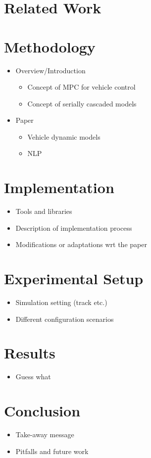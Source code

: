 \documentclass[a4paper, twocolumn, 11pt, twoside]{article}
\begin{document}
\section*{Related Work}


\section*{Methodology}

\begin{itemize}
    \item Overview/Introduction
    \begin{itemize}
        \item Concept of MPC for vehicle control
        \item Concept of serially cascaded models 
    \end{itemize}

    \item Paper
    \begin{itemize}
        \item Vehicle dynamic models
        \item NLP
    \end{itemize}    
\end{itemize}

\section*{Implementation}

\begin{itemize}
    \item Tools and libraries
    \item Description of implementation process
    \item Modifications or adaptations wrt the paper
\end{itemize}

\section*{Experimental Setup}

\begin{itemize}
    \item Simulation setting (track etc.)
    \item Different configuration scenarios
\end{itemize}

\section*{Results}

\begin{itemize}
    \item Guess what
\end{itemize}

\section*{Conclusion}

\begin{itemize}
    \item Take-away message
    \item Pitfalls and future work
\end{itemize}




\end{document}

